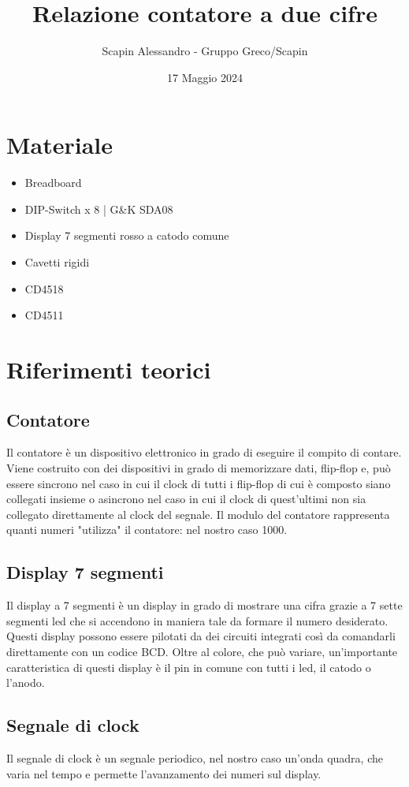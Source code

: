 \documentclass[a4paper, 10pt]{RelazioneLab}
\title{Relazione contatore a due cifre}
\author{Scapin Alessandro - Gruppo Greco/Scapin}
\date{17 Maggio 2024}
\begin{document}
\maketitle

\section{Materiale}
\begin{multicols}{2}
    \begin{itemize}
        \item Breadboard
        \item DIP-Switch x 8 | G\&K SDA08
        \item Display 7 segmenti rosso a catodo comune
        \item Cavetti rigidi
        \item CD4518
        \item CD4511
    \end{itemize}
\end{multicols}
\section{Riferimenti teorici}
\subsection{Contatore}
Il contatore è un dispositivo elettronico in grado di eseguire il compito di contare. Viene costruito con dei dispositivi in grado di memorizzare dati, flip-flop e, può essere sincrono nel caso in cui il clock di tutti i flip-flop di cui è composto siano collegati insieme o asincrono nel caso in cui il clock di quest'ultimi non sia collegato direttamente al clock del segnale. Il modulo del contatore rappresenta quanti numeri "utilizza" il contatore: nel nostro caso 1000.
\subsection{Display 7 segmenti}
Il display a 7 segmenti è un display in grado di mostrare una cifra grazie a 7 sette segmenti led che si accendono in maniera tale da formare il numero desiderato. Questi display possono essere pilotati da dei circuiti integrati così da comandarli direttamente con un codice BCD. Oltre al colore, che può variare, un'importante caratteristica di questi display è il pin in comune con tutti i led, il catodo o l'anodo.
\subsection{Segnale di clock}
Il segnale di clock è un segnale periodico, nel nostro caso un'onda quadra, che varia nel tempo e permette l'avanzamento dei numeri sul display.
\end{document}
